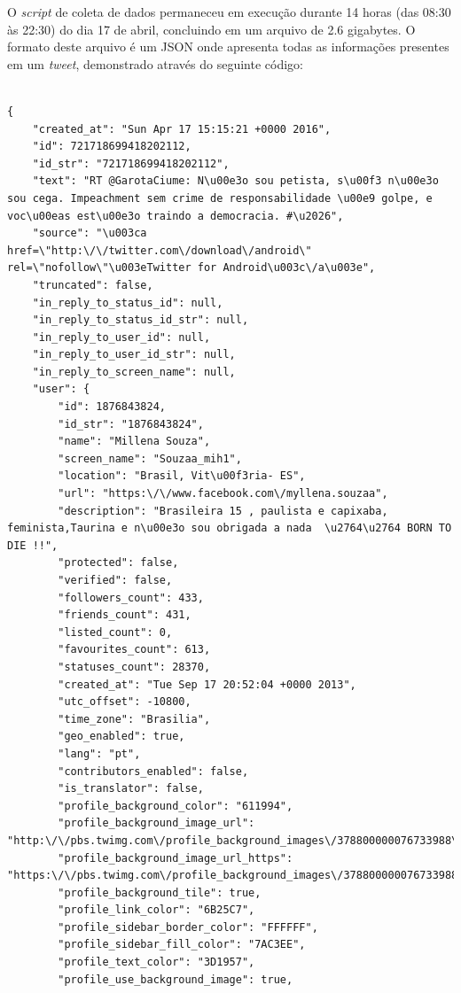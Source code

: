 O \textit{script} de coleta de dados permaneceu em execução durante 14 horas (das 08:30 às 22:30) do dia 17 de abril, concluindo em um arquivo de 2.6 gigabytes. O formato deste arquivo é um JSON onde apresenta todas as informações presentes em um \textit{tweet}, demonstrado através do seguinte código: \\ \\

\begin{lstlisting}
{
    "created_at": "Sun Apr 17 15:15:21 +0000 2016",
    "id": 721718699418202112,
    "id_str": "721718699418202112",
    "text": "RT @GarotaCiume: N\u00e3o sou petista, s\u00f3 n\u00e3o sou cega. Impeachment sem crime de responsabilidade \u00e9 golpe, e voc\u00eas est\u00e3o traindo a democracia. #\u2026",
    "source": "\u003ca href=\"http:\/\/twitter.com\/download\/android\" rel=\"nofollow\"\u003eTwitter for Android\u003c\/a\u003e",
    "truncated": false,
    "in_reply_to_status_id": null,
    "in_reply_to_status_id_str": null,
    "in_reply_to_user_id": null,
    "in_reply_to_user_id_str": null,
    "in_reply_to_screen_name": null,
    "user": {
        "id": 1876843824,
        "id_str": "1876843824",
        "name": "Millena Souza",
        "screen_name": "Souzaa_mih1",
        "location": "Brasil, Vit\u00f3ria- ES",
        "url": "https:\/\/www.facebook.com\/myllena.souzaa",
        "description": "Brasileira 15 , paulista e capixaba, feminista,Taurina e n\u00e3o sou obrigada a nada  \u2764\u2764 BORN TO DIE !!",
        "protected": false,
        "verified": false,
        "followers_count": 433,
        "friends_count": 431,
        "listed_count": 0,
        "favourites_count": 613,
        "statuses_count": 28370,
        "created_at": "Tue Sep 17 20:52:04 +0000 2013",
        "utc_offset": -10800,
        "time_zone": "Brasilia",
        "geo_enabled": true,
        "lang": "pt",
        "contributors_enabled": false,
        "is_translator": false,
        "profile_background_color": "611994",
        "profile_background_image_url": "http:\/\/pbs.twimg.com\/profile_background_images\/378800000076733988\/60df12d5296d8d8081e19c306c15c859.jpeg",
        "profile_background_image_url_https": "https:\/\/pbs.twimg.com\/profile_background_images\/378800000076733988\/60df12d5296d8d8081e19c306c15c859.jpeg",
        "profile_background_tile": true,
        "profile_link_color": "6B25C7",
        "profile_sidebar_border_color": "FFFFFF",
        "profile_sidebar_fill_color": "7AC3EE",
        "profile_text_color": "3D1957",
        "profile_use_background_image": true,

\end{lstlisting}
